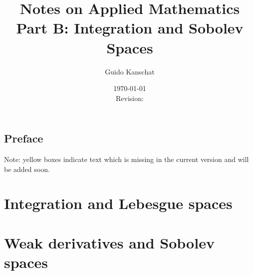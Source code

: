 \documentclass[USenglish,limits]{report}
\title{\textbf{Notes on Applied Mathematics}
\\[5mm]
{\large Part B: Integration and Sobolev Spaces}}
\author{Guido Kanschat}
\date{\today\\[5mm]Revision: \svnrev}
\begin{document}
\maketitle

\section*{Preface}


\begin{todo}
  Note: yellow boxes indicate text which is missing in the current
  version and will be added soon.
\end{todo}

\tableofcontents

\chapter{Integration and Lebesgue spaces}



\chapter{Weak derivatives and Sobolev spaces}




\printbibliography
\printindex
\end{document}
